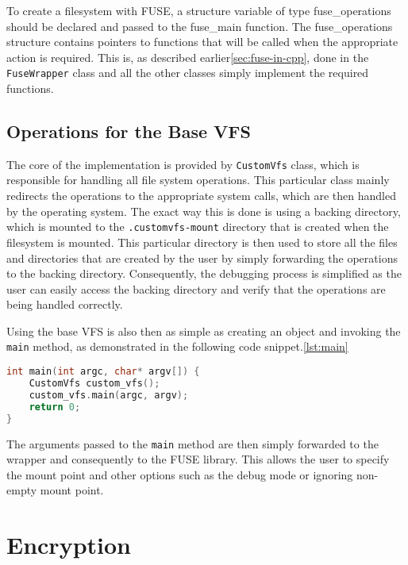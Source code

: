 To create a filesystem with FUSE, a structure variable of type fuse\_operations should be declared and passed to the fuse\_main function.
The fuse\_operations structure contains pointers to functions that will be called when the appropriate action is required.
This is, as described earlier\ref{sec:fuse-in-cpp}, done in the \texttt{FuseWrapper} class and all the other classes simply implement the required functions.

\subsection{Operations for the Base VFS}\label{subsec:base-ops}

The core of the implementation is provided by \texttt{CustomVfs} class, which is responsible for handling all file system operations.
This particular class mainly redirects the operations to the appropriate system calls, which are then handled by the operating system.
The exact way this is done is using a backing directory, which is mounted to the \texttt{.customvfs-{mount}} directory that is created when the filesystem is mounted.
This particular directory is then used to store all the files and directories that are created by the user by simply forwarding the operations to the backing directory.
Consequently, the debugging process is simplified as the user can easily access the backing directory and verify that the operations are being handled correctly.

Using the base VFS is also then as simple as creating an object and invoking the \texttt{main} method, as demonstrated in the following code snippet.\ref{lst:main}

\begin{lstlisting}[language=c++, basicstyle=\ttfamily\small, caption={Main method of the \texttt{CustomVfs} class.}, label={lst:main}]
int main(int argc, char* argv[]) {
    CustomVfs custom_vfs();
    custom_vfs.main(argc, argv);
    return 0;
}
\end{lstlisting}

The arguments passed to the \texttt{main} method are then simply forwarded to the wrapper and consequently to the FUSE library.
This allows the user to specify the mount point and other options such as the debug mode or ignoring non-empty mount point.


\section{Encryption}\label{sec:encryption}

